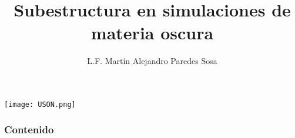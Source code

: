 \documentclass{beamer}
\title[]{Subestructura en simulaciones de materia oscura} %
\author{L.F. Martín Alejandro Paredes Sosa} %
\institute[Universidad de Sonora MCF ] %
{
Universidad de Sonora\\ %
\medskip
\textbf{Director}: Dr. Carlos Calcáneo Roldan \\
\medskip
\tiny{Maestría en Ciencias (Física)}\\
\medskip
\tiny{Hermosillo, Sonora a Junio, 2023 }
}
\date{} %
\begin{document}
{
\begin{frame}
\titlepage %
\vspace*{-2.0cm}
\hspace*{8.5cm}
\texttt{[image: USON.png]}

\end{frame}

\begin{frame}
    \frametitle{Contenido}
    
    \begin{columns}[t]
        
        \begin{column}{.5\textwidth}
            \tableofcontents[sections={1-2}]
        \end{column}

        \begin{column}{.5\textwidth}
            \tableofcontents[sections={3-5}]

        \end{column}

    \end{columns}

\end{frame}
%
%
}
\addtocounter{framenumber}{-1} %

\end{document}
